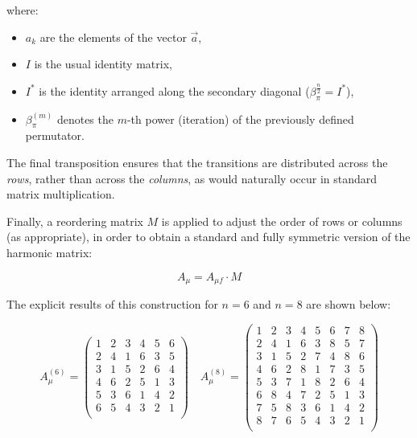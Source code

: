 \documentclass{article}
\begin{document}
where:
\begin{itemize}
    \item \(a_k\) are the elements of the vector \(\vec{a}\),
    \item \(I\) is the usual identity matrix,
    \item \(I^*\) is the identity arranged along the secondary diagonal (\(\beta_\pi^{\frac{n}{2}} = I^*\)),
    \item \(\beta_\pi^{(m)}\) denotes the \(m\)-th power (iteration) of the previously defined permutator.
\end{itemize}

The final transposition ensures that the transitions are distributed across the \emph{rows}, rather than across the \emph{columns}, as would naturally occur in standard matrix multiplication.

\medskip

Finally, a reordering matrix \(M\) is applied to adjust the order of rows or columns (as appropriate), in order to obtain a standard and fully symmetric version of the harmonic matrix:

\begin{equation}
    A_\mu = A_{\mu f} \cdot M
\end{equation}

\medskip

\noindent The explicit results of this construction for \(n = 6\) and \(n = 8\) are shown below:


\[
A_\mu^{(6)} =
\begin{pmatrix}
1 & 2 & 3 & 4 & 5 & 6 \\
2 & 4 & 1 & 6 & 3 & 5 \\
3 & 1 & 5 & 2 & 6 & 4 \\
4 & 6 & 2 & 5 & 1 & 3 \\
5 & 3 & 6 & 1 & 4 & 2 \\
6 & 5 & 4 & 3 & 2 & 1 \\
\end{pmatrix}
\quad
A_\mu^{(8)} =
\begin{pmatrix}
1 & 2 & 3 & 4 & 5 & 6 & 7 & 8 \\
2 & 4 & 1 & 6 & 3 & 8 & 5 & 7 \\
3 & 1 & 5 & 2 & 7 & 4 & 8 & 6 \\
4 & 6 & 2 & 8 & 1 & 7 & 3 & 5 \\
5 & 3 & 7 & 1 & 8 & 2 & 6 & 4 \\
6 & 8 & 4 & 7 & 2 & 5 & 1 & 3 \\
7 & 5 & 8 & 3 & 6 & 1 & 4 & 2 \\
8 & 7 & 6 & 5 & 4 & 3 & 2 & 1 \\
\end{pmatrix}
\]
\end{document}

